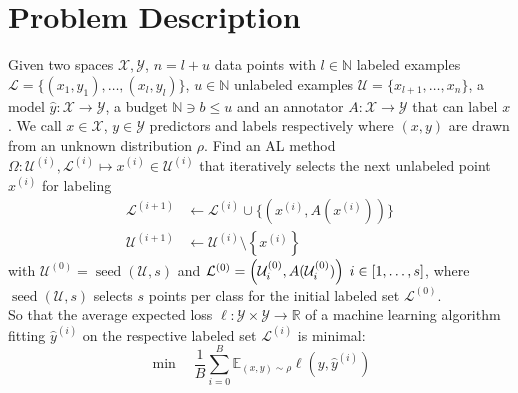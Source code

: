 \documentclass[]{article}
\newcommand{\X}{\mathcal{X}}
\newcommand{\Y}{\mathcal{Y}}
\newcommand{\U}{\mathcal{U}}
\newcommand{\LL}{\mathcal{L}}
\begin{document}
\section{Problem Description}
Given two spaces $\X, \Y$, $n=l+u$ data points with $l \in \mathbb{N}$ labeled examples $\mathcal{L} = \{(x_1, y_1),\ldots, (x_l,y_l)\}$, $u \in \mathbb{N}$ unlabeled examples $\mathcal{U} = \{x_{l+1},\ldots,x_{n}\}$, a model $\hat y: \X \to \Y$, a budget $\mathbb{N} \ni b \le u$ and an annotator $A: \mathcal{X} \to \mathcal{Y}$ that can label $x$. %
We call $x \in \mathcal{X}$, $y \in \mathcal{Y}$ predictors and labels respectively where $(x,y)$ are drawn from an unknown distribution $\rho$. 
Find an AL method $\Omega: \U^{(i)},\LL^{(i)} \mapsto x^{(i)} \in \U^{(i)}$ that iteratively selects the next unlabeled point $x^{(i)}$ for labeling
\begin{align*}
	\LL^{(i+1)} &\gets \LL^{(i)} \cup \{\left(x^{(i)}, A(x^{(i)})\right)\} \\
	\U^{(i+1)} &\gets \U^{(i)} \setminus \left\{x^{(i)}\right\} %
\end{align*}
with $\U^{(0)} = \operatorname{seed}(\U, s)$ and $\LL^{(0)} = \left(\U^{(0)}_i, A(\U^{(0)}_i)\right) \hspace{1mm} i \in [1, \ldots, s]$, where $\operatorname{seed}(\U, s)$ selects $s$ points per class for the initial labeled set $\LL^{(0)}$. \\
So that the average expected loss $\ell: \mathcal{Y} \times \mathcal{Y} \to \mathbb{R}$ of a machine learning algorithm fitting $\hat y^{(i)}$ on the respective labeled set $\LL^{(i)}$ is minimal: 
$$\min \quad \frac{1}{B} \sum\limits_{i=0}^B \mathbb{E}_{(x,y) \sim \rho} \ell(y, \hat y^{(i)})$$

\end{document}
